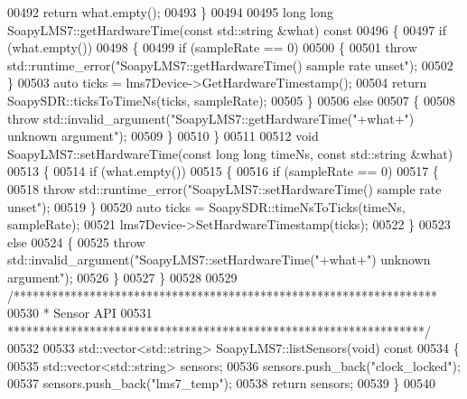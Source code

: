 \begin{DoxyCode}
{{{{{{{{{{{{{{00492     \textcolor{keywordflow}{return} what.empty();
00493 \}
00494 
00495 \textcolor{keywordtype}{long} \textcolor{keywordtype}{long} SoapyLMS7::getHardwareTime(\textcolor{keyword}{const} std::string &what)\textcolor{keyword}{ const}
00496 \textcolor{keyword}{}\{
00497     \textcolor{keywordflow}{if} (what.empty())
00498     \{
00499         \textcolor{keywordflow}{if} (sampleRate == 0)
00500         \{
00501             \textcolor{keywordflow}{throw} std::runtime\_error(\textcolor{stringliteral}{"SoapyLMS7::getHardwareTime() sample rate unset"});
00502         \}
00503         \textcolor{keyword}{auto} ticks = lms7Device->GetHardwareTimestamp();
00504         \textcolor{keywordflow}{return} SoapySDR::ticksToTimeNs(ticks, sampleRate);
00505     \}
00506     \textcolor{keywordflow}{else}
00507     \{
00508         \textcolor{keywordflow}{throw} std::invalid\_argument(\textcolor{stringliteral}{"SoapyLMS7::getHardwareTime("}+what+\textcolor{stringliteral}{") unknown argument"});
00509     \}
00510 \}
00511 
00512 \textcolor{keywordtype}{void} SoapyLMS7::setHardwareTime(\textcolor{keyword}{const} \textcolor{keywordtype}{long} \textcolor{keywordtype}{long} timeNs, \textcolor{keyword}{const} std::string &what)
00513 \{
00514     \textcolor{keywordflow}{if} (what.empty())
00515     \{
00516         \textcolor{keywordflow}{if} (sampleRate == 0)
00517         \{
00518             \textcolor{keywordflow}{throw} std::runtime\_error(\textcolor{stringliteral}{"SoapyLMS7::setHardwareTime() sample rate unset"});
00519         \}
00520         \textcolor{keyword}{auto} ticks = SoapySDR::timeNsToTicks(timeNs, sampleRate);
00521         lms7Device->SetHardwareTimestamp(ticks);
00522     \}
00523     \textcolor{keywordflow}{else}
00524     \{
00525         \textcolor{keywordflow}{throw} std::invalid\_argument(\textcolor{stringliteral}{"SoapyLMS7::setHardwareTime("}+what+\textcolor{stringliteral}{") unknown argument"});
00526     \}
00527 \}
00528 
00529 \textcolor{comment}{/*******************************************************************}
00530 \textcolor{comment}{ * Sensor API}
00531 \textcolor{comment}{ ******************************************************************/}
00532 
00533 std::vector<std::string> SoapyLMS7::listSensors(\textcolor{keywordtype}{void})\textcolor{keyword}{ const}
00534 \textcolor{keyword}{}\{
00535     std::vector<std::string> sensors;
00536     sensors.push\_back(\textcolor{stringliteral}{"clock\_locked"});
00537     sensors.push\_back(\textcolor{stringliteral}{"lms7\_temp"});
00538     \textcolor{keywordflow}{return} sensors;
00539 \}
00540 
}}}}}}}}}}}}}}
\end{DoxyCode}
